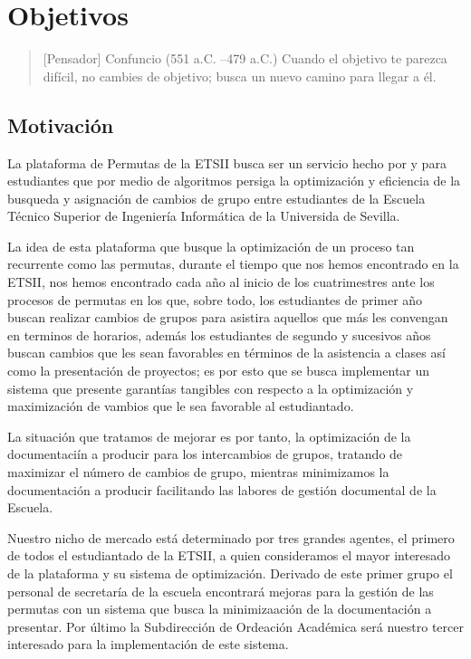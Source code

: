 \chapter{Objetivos}

\begin{quotation} [Pensador] {Confuncio (551 a.C. --479 a.C.)}
Cuando el objetivo te parezca difícil, no cambies de objetivo; busca un nuevo camino para llegar a él.
\end{quotation}

\begin{abstract}
Para gestionar exitosamente un proyecto es prioritario saber los objetivos que pretendemos alcanzar. 
\end{abstract}


\newpage
\section{Motivación}

La plataforma de Permutas de la ETSII busca ser un servicio hecho por y para estudiantes que por medio de algoritmos persiga la optimización y eficiencia de la busqueda y asignación de cambios de grupo entre estudiantes de la Escuela Técnico Superior de Ingeniería Informática de la Universida de Sevilla.

La idea de esta plataforma que busque la optimización de un proceso tan recurrente como las permutas, durante el tiempo que nos hemos encontrado en la ETSII, nos hemos encontrado cada año al inicio de los cuatrimestres ante los procesos de permutas en los que, sobre todo, los estudiantes de primer año buscan realizar cambios de grupos para asistira aquellos que más les convengan en terminos de horarios, además los estudiantes de segundo y sucesivos años buscan cambios que les sean favorables en términos de la asistencia a clases así como la presentación de proyectos; es por esto que se busca implementar un sistema que presente garantías tangibles con respecto a la optimización y maximización de vambios que le sea favorable al estudiantado.

La situación que tratamos de mejorar es por tanto, la optimización de la documentaciín a producir para los intercambios de grupos, tratando de maximizar el número de cambios de grupo, mientras minimizamos la documentación a producir facilitando las labores de gestión documental de la Escuela. 

Nuestro nicho de mercado está determinado por tres grandes agentes, el primero de todos el estudiantado de la ETSII, a quien consideramos el mayor interesado de la plataforma y su sistema de optimización. Derivado de este primer grupo el personal de secretaría de la escuela encontrará mejoras para la gestión de las permutas con un sistema que busca la minimizaación de la documentación a presentar. Por último la Subdirección de Ordeación Académica será nuestro tercer interesado para la implementación de este sistema. 

